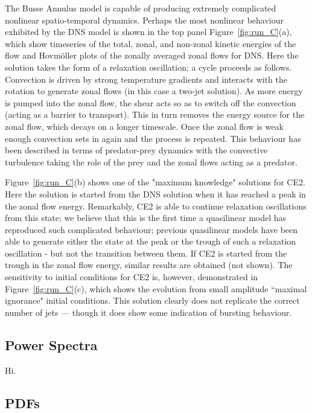 \documentclass{jfm}
\begin{document}
The Busse Annulus model is capable of producing extremely complicated nonlinear spatio-temporal dynamics. Perhaps the most nonlinear behaviour exhibited by the DNS model is shown in the top panel Figure~\ref{fig:run_C}(a), which show timeseries of the total, zonal, and non-zonal kinetic energies of the flow and Hovm\"oller plots of the zonally averaged zonal flows for DNS. Here the solution takes the form of a relaxation oscillation; a cycle proceeds as follows. Convection is driven by strong temperature gradients and interacts with the rotation to generate zonal flows (in this case a two-jet solution). As more energy is pumped into the zonal flow, the shear acts so as to switch off the convection (acting as a barrier to transport). This in turn removes the energy source for the zonal flow, which decays on a longer timescale. Once the zonal flow is weak enough convection sets in again and the process is repeated. This behaviour has been described in terms of predator-prey dynamics with the convective turbulence taking the role of the prey and the zonal flows acting as a predator. 

Figure~\ref{fig:run_C}(b) shows one of the "maximum knowledge" solutions for CE2. Here the solution is started from the DNS solution when it has reached a peak in the zonal flow energy. Remarkably, CE2 is able to continue relaxation oscillations from this state; we believe that this is the first time a quasilinear model has reproduced such complicated behaviour; previous quasilinear models have been able to generate either the state at the peak or the trough of such a relaxation oscillation - but not the transition between them. If CE2 is started from the trough in the zonal flow energy, similar results are obtained (not shown). The sensitivity to initial conditions for CE2 is, however, demonstrated in Figure~\ref{fig:run_C}(c), which shows the evolution from small amplitude ``maximal ignorance" initial conditions. This solution clearly does not replicate the correct number of jets --- though it does show some indication of bursting behaviour.




\subsection{Power Spectra}
\label{sec:powerspec}
Hi.



\subsection{PDFs}
\label{sec:pdf}
\end{document}
